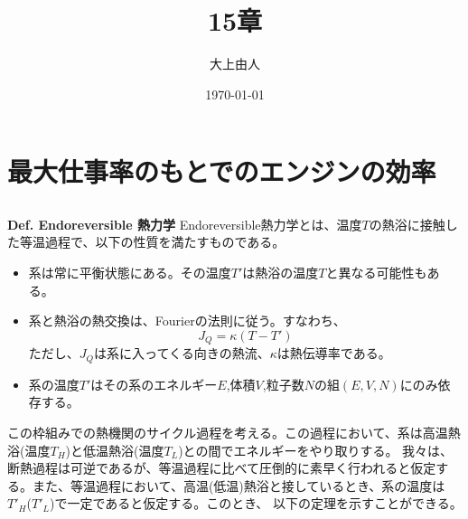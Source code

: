 \documentclass[a4paper,11pt]{jsarticle}
\numberwithin{equation}{section}
\begin{document}
\title{15章}
\author{大上由人}
\date{\today}
\maketitle
\setcounter{section}{14}

\section{最大仕事率のもとでのエンジンの効率}
\subsection{}

\begin{itembox}[l]{\textbf{Def. Endoreversible 熱力学}}
  Endoreversible熱力学とは、温度$T$の熱浴に接触した等温過程で、以下の性質を満たすものである。
  \begin{itemize}
    \item 系は常に平衡状態にある。その温度$T'$は熱浴の温度$T$と異なる可能性もある。
    \item 系と熱浴の熱交換は、Fourierの法則に従う。すなわち、
    \begin{equation}
      J_{Q} = \kappa(T-T')
    \end{equation}
    ただし、$J_{Q}$は系に入ってくる向きの熱流、$\kappa$は熱伝導率である。
    \item 系の温度$T'$はその系のエネルギー$E$,体積$V$,粒子数$N$の組$(E,V,N)$にのみ依存する。
  \end{itemize}
\end{itembox}
この枠組みでの熱機関のサイクル過程を考える。この過程において、系は高温熱浴(温度$T_{H}$)と低温熱浴(温度$T_{L}$)との間でエネルギーをやり取りする。
我々は、断熱過程は可逆であるが、等温過程に比べて圧倒的に素早く行われると仮定する。また、等温過程において、高温(低温)熱浴と接しているとき、系の温度は$T'_H$($T'_L$)で一定であると仮定する。このとき、
以下の定理を示すことができる。
\end{document}
